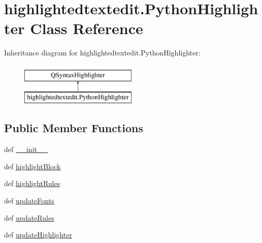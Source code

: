 \hypertarget{classhighlightedtextedit_1_1PythonHighlighter}{}\section{highlightedtextedit.\+Python\+Highlighter Class Reference}
\label{classhighlightedtextedit_1_1PythonHighlighter}
Inheritance diagram for highlightedtextedit.\+Python\+Highlighter\+:\begin{figure}[H]
\begin{center}
\leavevmode
\includegraphics[height=2.000000cm]{classhighlightedtextedit_1_1PythonHighlighter}
\end{center}
\end{figure}
\subsection*{Public Member Functions}
\begin{DoxyCompactItemize}
\item 
def \hyperlink{classhighlightedtextedit_1_1PythonHighlighter_a5663c697c9af37609e463cda7a295e4e}{\+\_\+\+\_\+init\+\_\+\+\_\+}
\item 
def \hyperlink{classhighlightedtextedit_1_1PythonHighlighter_aaa3b166168e61855e52143bd104a2dfb}{highlight\+Block}
\item 
def \hyperlink{classhighlightedtextedit_1_1PythonHighlighter_aba85254aa8b4428c60f5a85b666486fc}{highlight\+Rules}
\item 
def \hyperlink{classhighlightedtextedit_1_1PythonHighlighter_a4d259f999739d96a9f955988e96df645}{update\+Fonts}
\item 
def \hyperlink{classhighlightedtextedit_1_1PythonHighlighter_a57994914fb9c739baeb0fbcfc4a18665}{update\+Rules}
\item 
def \hyperlink{classhighlightedtextedit_1_1PythonHighlighter_a7fb9903af774d24d7db0323655bcba1c}{update\+Highlighter}
\end{DoxyCompactItemize}
